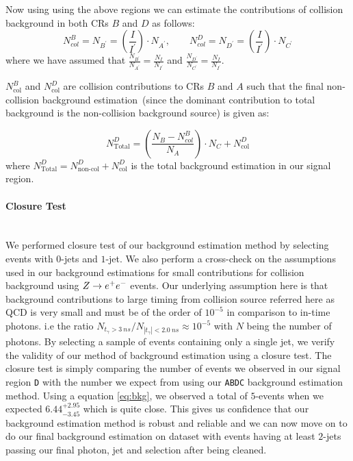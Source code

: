 Now using using the above regions we can estimate the contributions of collision background in both CRs $B$ and $D$ as follows:
\begin{equation}
\displaystyle{N^{B}_{col} = N_{B^{\prime}}  = \left( \frac{I}{I^{\prime}} \right)\cdot N_{A^{\prime}}}, \quad \quad
\displaystyle{N^{D}_{col} = N_{D^{\prime}}  = \left( \frac{I}{I^{\prime}} \right)\cdot N_{C^{\prime}}}
\end{equation}
where we have assumed that $\frac{N_{B^{\prime}}}{N_{A^{\prime}}}  = \frac{N_{I}}{N_{I^{\prime}}}$ and  $\frac{N_{D^{\prime}}}{N_{C^{\prime}}}  = \frac{N_{I}}{N_{I^{\prime}}}$.
\newline

$N^{B}_{\mbox{col}}$ and $N^{D}_{\mbox{col}}$ are collision contributions to  CRs $B$ and $A$ such that the final non-collision background estimation~(since the dominant contribution to total background  is the non-collision background source) is given as:

\begin{equation}
N^{D}_{\mbox{Total}} = \left(\frac{N_{B} - N^{B}_{col} }{N_{A}} \right)\cdot N_{C} + N^{D}_{\mbox{col}} 
\end{equation}\label{eq:bkg}
where $N^{D}_{\mbox{Total}} = N^{D}_{\mbox{non-col}} + N^{D}_{\mbox{col}}$ is the total background estimation in  our signal region.



\paragraph*{Closure Test}\mbox{}\\
We performed closure test of our background estimation method by selecting events with $0$-jets and $1$-jet. We also perform a cross-check on the assumptions used in our background estimations for small contributions for collision background using $Z\rightarrow e^+e^-$ events. 
Our underlying assumption here is that background contributions to large timing from collision source referred here as QCD is very small and must be of the order of $10^{-5}$ in comparison to in-time photons. i.e the ratio 
$ N_{t_{\gamma} > 3~ns}/ N_{|t_{\gamma}| < 2.0~ns} \approx 10^{-5}$ with $N$ being the number of photons.
By selecting a sample of events containing only a single jet, we verify the validity of our method of background estimation using a closure test. The closure test is simply comparing the number of events we observed in our signal region \texttt{D} with the number we expect from using our \texttt{ABDC} background estimation method.
Using a equation \ref{eq:bkg}, we observed a total of $5$-events when we expected $6.44^{+2.95}_{-3.45}$ which is quite close. This gives us confidence that our  background estimation method is robust and reliable and we can now move on to do our final background estimation on dataset with events having at least $2$-jets passing our final photon, jet and \MET selection after being cleaned.

